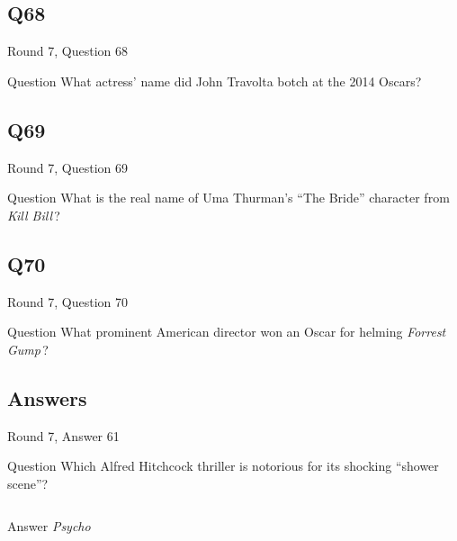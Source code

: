 \documentclass[11pt]{beamer}
\begin{document}
\subsection*{Q68}
\begin{frame}[t]{Round 7, Question 68}
  \vspace{2em}
  \begin{block}{Question}
    What actress' name did John Travolta botch at the 2014 Oscars?
  \end{block}
\end{frame}


\subsection*{Q69}
\begin{frame}[t]{Round 7, Question 69}
  \vspace{2em}
  \begin{block}{Question}
    What is the real name of Uma Thurman's ``The Bride'' character from \emph{Kill Bill}\,?
  \end{block}
\end{frame}


\subsection*{Q70}
\begin{frame}[t]{Round 7, Question 70}
  \vspace{2em}
  \begin{block}{Question}
    What prominent American director won an Oscar for helming \emph{Forrest Gump}\,?
  \end{block}
\end{frame}

\subsection{Answers}

\begin{frame}[t]{Round 7, Answer 61}
  \vspace{2em}
  \begin{block}{Question}
    Which Alfred Hitchcock thriller is notorious for its shocking ``shower scene''?
  \end{block}
  \pause{}
  \begin{columns}[T,totalwidth=\linewidth]
    \begin{column}{0.35\linewidth}
      \begin{block}{Answer}
        \emph{Psycho}
      \end{block}
    \end{column}
    \begin{column}{0.6\linewidth}
      \begin{center}
        \texttt{[image: \{Images/psycho-shower-scene-mother-620]}.jpg}
      \end{center}
    \end{column}
  \end{columns}
\end{frame}
\end{document}
